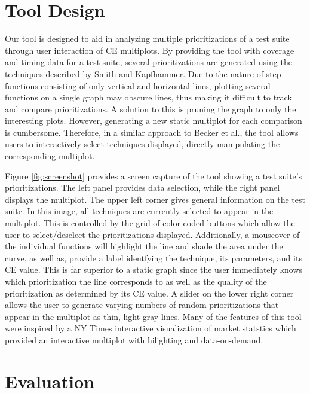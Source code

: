 \documentclass{vgtc}                          %
\begin{document}
\section{Tool Design}

Our tool is designed to aid in analyzing multiple prioritizations of a test suite through user interaction of CE multiplots.  By providing the tool with coverage and timing data for a test suite, several prioritizations are generated using the techniques described by Smith and Kapfhammer\cite{smith:2009}.  Due to the nature of step functions consisting of only vertical and horizontal lines, plotting several functions on a single graph may obscure lines, thus making it difficult to track and compare prioritizations.  A solution to this is pruning the graph to only the interesting plots.  However, generating a new static multiplot for each comparison is cumbersome.  Therefore, in a similar approach to Becker et al., the tool allows users to interactively select techniques displayed, directly manipulating the corresponding multiplot\cite{Stephen95visualizingnetwork}.

Figure \ref{fig:screenshot} provides a screen capture of the tool showing a test suite's prioritizations.  The left panel provides data selection, while the right panel displays the multiplot.  The upper left corner gives general information on the test suite.  In this image, all techniques are currently selected to appear in the multiplot.  This is controlled by the grid of color-coded buttons which allow the user to select/deselect the prioritizations displayed.  Additionally, a mouseover of the individual functions will highlight the line and shade the area under the curve, as well as, provide a label identfying the technique, its parameters, and its CE value.  This is far superior to a static graph since the user immediately knows which prioritization the line corresponds to as well as the quality of the prioritization as determined by its CE value.  A slider on the lower right corner allows the user to generate varying numbers of random prioritizations that appear in the multiplot as thin, light gray lines.  Many of the features of this tool were inspired by a NY Times interactive visualization of market statstics which provided an interactive multiplot with hilighting and data-on-demand\cite{nytime_multiplot}.


\section{Evaluation}
\end{document}
